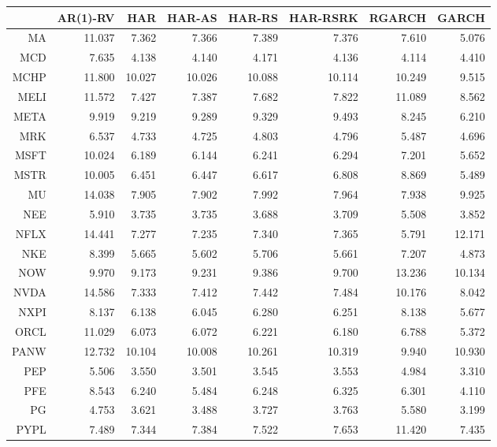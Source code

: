 \begin{table}[ht]
\centering
\begin{tabular}{rrrrrrrr}
  \hline
 & AR(1)-RV & HAR & HAR-AS & HAR-RS & HAR-RSRK & RGARCH & GARCH \\ 
  \hline
MA & 11.037 & 7.362 & 7.366 & 7.389 & 7.376 & 7.610 & 5.076 \\ 
  MCD & 7.635 & 4.138 & 4.140 & 4.171 & 4.136 & 4.114 & 4.410 \\ 
  MCHP & 11.800 & 10.027 & 10.026 & 10.088 & 10.114 & 10.249 & 9.515 \\ 
  MELI & 11.572 & 7.427 & 7.387 & 7.682 & 7.822 & 11.089 & 8.562 \\ 
  META & 9.919 & 9.219 & 9.289 & 9.329 & 9.493 & 8.245 & 6.210 \\ 
  MRK & 6.537 & 4.733 & 4.725 & 4.803 & 4.796 & 5.487 & 4.696 \\ 
  MSFT & 10.024 & 6.189 & 6.144 & 6.241 & 6.294 & 7.201 & 5.652 \\ 
  MSTR & 10.005 & 6.451 & 6.447 & 6.617 & 6.808 & 8.869 & 5.489 \\ 
  MU & 14.038 & 7.905 & 7.902 & 7.992 & 7.964 & 7.938 & 9.925 \\ 
  NEE & 5.910 & 3.735 & 3.735 & 3.688 & 3.709 & 5.508 & 3.852 \\ 
  NFLX & 14.441 & 7.277 & 7.235 & 7.340 & 7.365 & 5.791 & 12.171 \\ 
  NKE & 8.399 & 5.665 & 5.602 & 5.706 & 5.661 & 7.207 & 4.873 \\ 
  NOW & 9.970 & 9.173 & 9.231 & 9.386 & 9.700 & 13.236 & 10.134 \\ 
  NVDA & 14.586 & 7.333 & 7.412 & 7.442 & 7.484 & 10.176 & 8.042 \\ 
  NXPI & 8.137 & 6.138 & 6.045 & 6.280 & 6.251 & 8.138 & 5.677 \\ 
  ORCL & 11.029 & 6.073 & 6.072 & 6.221 & 6.180 & 6.788 & 5.372 \\ 
  PANW & 12.732 & 10.104 & 10.008 & 10.261 & 10.319 & 9.940 & 10.930 \\ 
  PEP & 5.506 & 3.550 & 3.501 & 3.545 & 3.553 & 4.984 & 3.310 \\ 
  PFE & 8.543 & 6.240 & 5.484 & 6.248 & 6.325 & 6.301 & 4.110 \\ 
  PG & 4.753 & 3.621 & 3.488 & 3.727 & 3.763 & 5.580 & 3.199 \\ 
  PYPL & 7.489 & 7.344 & 7.384 & 7.522 & 7.653 & 11.420 & 7.435 \\ 

\end{tabular}
\end{table}
